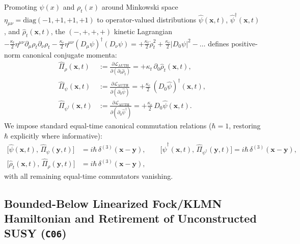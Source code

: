 Promoting $\psi(x)$ and $\rho_t(x)$ around Minkowski space $\eta_{\mu\nu} = \mathrm{diag}(-1,+1,+1,+1)$ to operator-valued distributions $\hat{\psi}(\mathbf{x},t)$, $\hat{\psi}^\dagger(\mathbf{x},t)$, and $\hat{\rho}_t(\mathbf{x},t)$, the $(-,+,+,+)$ kinetic Lagrangian $-\frac{\kappa_t}{2}\eta^{\mu\nu}\partial_\mu\rho_t\partial_\nu\rho_t - \frac{\kappa_c}{2}\eta^{\mu\nu}(D_\mu\psi)^\dagger(D_\nu\psi) = +\frac{\kappa_t}{2}\dot{\rho}_t^2 + \frac{\kappa_c}{2}|D_0\psi|^2 - \dots$ defines positive-norm canonical conjugate momenta:
\begin{align}
\hat{\Pi}_\rho(\mathbf{x},t) &:= \frac{\partial\mathcal{L}_{\mathrm{AUTH}}}{\partial(\partial_0\hat{\rho}_t)} = +\kappa_t\,\partial_0\hat{\rho}_t(\mathbf{x},t), \label{eq:canon_mom_rho}\\
\hat{\Pi}_\psi(\mathbf{x},t) &:= \frac{\partial\mathcal{L}_{\mathrm{AUTH}}}{\partial(\partial_0\hat{\psi})} = +\frac{\kappa_c}{2}\,(D_0\hat{\psi})^\dagger(\mathbf{x},t), \label{eq:canon_mom_psi}\\
\hat{\Pi}_{\psi^\dagger}(\mathbf{x},t) &:= \frac{\partial\mathcal{L}_{\mathrm{AUTH}}}{\partial(\partial_0\hat{\psi}^\dagger)} = +\frac{\kappa_c}{2}\,D_0\hat{\psi}(\mathbf{x},t). \label{eq:canon_mom_psidag}
\end{align}
We impose standard equal-time canonical commutation relations ($\hbar = 1$, restoring $\hbar$ explicitly where informative):
\begin{align}
\bigl[\hat{\psi}(\mathbf{x},t),\,\hat{\Pi}_\psi(\mathbf{y},t)\bigr] &= i\hbar\,\delta^{(3)}(\mathbf{x}-\mathbf{y}),
\qquad
\bigl[\hat{\psi}^\dagger(\mathbf{x},t),\,\hat{\Pi}_{\psi^\dagger}(\mathbf{y},t)\bigr] = i\hbar\,\delta^{(3)}(\mathbf{x}-\mathbf{y}), \nonumber\\
\bigl[\hat{\rho}_t(\mathbf{x},t),\,\hat{\Pi}_\rho(\mathbf{y},t)\bigr] &= i\hbar\,\delta^{(3)}(\mathbf{x}-\mathbf{y}),
\label{eq:equal_time_ccr}
\end{align}
with all remaining equal-time commutators vanishing.

\subsection{Bounded-Below Linearized Fock/KLMN Hamiltonian and Retirement of Unconstructed SUSY (\texttt{C06})}

